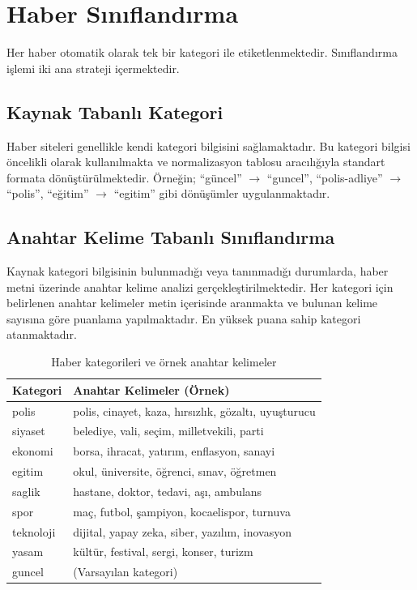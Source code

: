 \documentclass[conference]{IEEEtran}
\begin{document}
\section{Haber Sınıflandırma}
\label{sec:classification}

Her haber otomatik olarak tek bir kategori ile etiketlenmektedir. Sınıflandırma işlemi iki ana strateji içermektedir.

\subsection{Kaynak Tabanlı Kategori}

Haber siteleri genellikle kendi kategori bilgisini sağlamaktadır. Bu kategori bilgisi öncelikli olarak kullanılmakta ve normalizasyon tablosu aracılığıyla standart formata dönüştürülmektedir. Örneğin; ``güncel'' $\rightarrow$ ``guncel'', ``polis-adliye'' $\rightarrow$ ``polis'', ``eğitim'' $\rightarrow$ ``egitim'' gibi dönüşümler uygulanmaktadır.

\subsection{Anahtar Kelime Tabanlı Sınıflandırma}

Kaynak kategori bilgisinin bulunmadığı veya tanınmadığı durumlarda, haber metni üzerinde anahtar kelime analizi gerçekleştirilmektedir. Her kategori için belirlenen anahtar kelimeler metin içerisinde aranmakta ve bulunan kelime sayısına göre puanlama yapılmaktadır. En yüksek puana sahip kategori atanmaktadır.

\begin{table}[H]
\centering
\caption{Haber kategorileri ve örnek anahtar kelimeler}
\label{tab:kategoriler}
\begin{tabular}{@{}p{1.5cm}p{5.5cm}@{}}
\toprule
\textbf{Kategori} & \textbf{Anahtar Kelimeler (Örnek)} \\
\midrule
polis & polis, cinayet, kaza, hırsızlık, gözaltı, uyuşturucu \\
siyaset & belediye, vali, seçim, milletvekili, parti \\
ekonomi & borsa, ihracat, yatırım, enflasyon, sanayi \\
egitim & okul, üniversite, öğrenci, sınav, öğretmen \\
saglik & hastane, doktor, tedavi, aşı, ambulans \\
spor & maç, futbol, şampiyon, kocaelispor, turnuva \\
teknoloji & dijital, yapay zeka, siber, yazılım, inovasyon \\
yasam & kültür, festival, sergi, konser, turizm \\
guncel & (Varsayılan kategori) \\
\bottomrule
\end{tabular}
\end{table}
\end{document}

